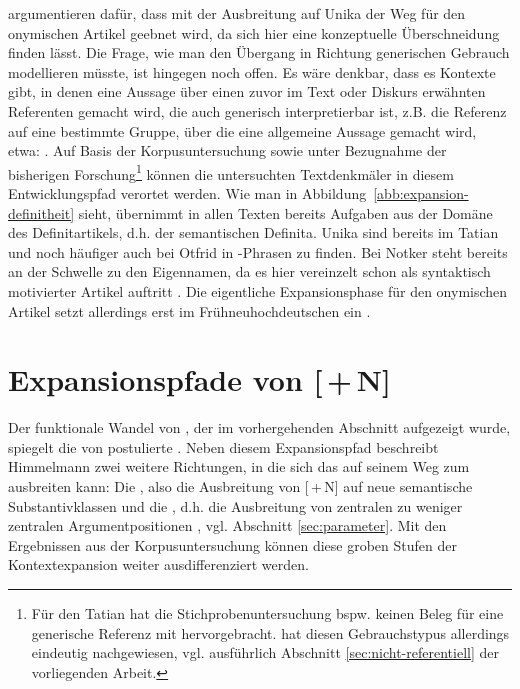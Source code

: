 \textcite[105]{Schmuck2014} argumentieren dafür, dass mit der Ausbreitung auf Unika  der Weg für den onymischen  Artikel  geebnet wird, da sich hier eine konzeptuelle Überschneidung finden lässt. Die Frage, wie man den Übergang in Richtung generischen  Gebrauch modellieren müsste, ist hingegen noch offen. Es wäre denkbar, dass es Kontexte gibt, in denen eine Aussage über einen zuvor im Text oder Diskurs erwähnten Referenten gemacht wird, die auch generisch  interpretierbar ist, z.B. die Referenz auf eine bestimmte Gruppe, über die eine allgemeine Aussage gemacht wird, etwa: . 
Auf Basis der Korpusuntersuchung  sowie unter Bezugnahme der bisherigen Forschung\footnote{Für den Tatian hat die Stichprobenuntersuchung bspw. keinen Beleg für eine generische  Referenz mit  hervorgebracht. \textcite{Oubouzar1992} hat diesen Gebrauchstypus allerdings eindeutig nachgewiesen, vgl. ausführlich Abschnitt \ref{sec:nicht-referentiell} der vorliegenden Arbeit.} können die untersuchten Textdenkmäler in diesem Entwicklungspfad verortet werden. Wie man in Abbildung~\ref{abb:expansion-definitheit} sieht, übernimmt   in allen Texten bereits Aufgaben aus der Domäne des  Definitartikels, d.h. der  semantischen Definita. Unika  sind bereits im Tatian und noch häufiger auch bei Otfrid in -Phrasen zu finden. Bei Notker steht  bereits an der Schwelle zu den  Eigennamen, da es hier vereinzelt schon als syntaktisch motivierter Artikel auftritt \parencite[ , s.][638]{Oubouzar1989}.
Die eigentliche Expansionsphase  für den onymischen Artikel  setzt allerdings erst im Frühneuhochdeutschen ein \parencite{Schmuck2020}. 


\section{Expansionspfade von [\,+\,N]} \label{sec:disk-expansion}

Der funktionale Wandel von , der im vorhergehenden Abschnitt aufgezeigt wurde, spiegelt die von \textcite[32--33]{Himmelmann2004} postulierte  . Neben diesem Expansionspfad  beschreibt Himmelmann zwei weitere Richtungen, in die sich das  auf seinem Weg zum  ausbreiten kann: Die  , also die Ausbreitung von [\,+\,N] auf neue semantische Substantivklassen und die  , d.h. die Ausbreitung von zentralen zu weniger zentralen Argumentpositionen \parencite[32--33]{Himmelmann2004}, vgl. Abschnitt \ref{sec:parameter}. Mit den Ergebnissen aus der Korpusuntersuchung  können diese groben Stufen der Kontextexpansion  weiter ausdifferenziert werden.  

